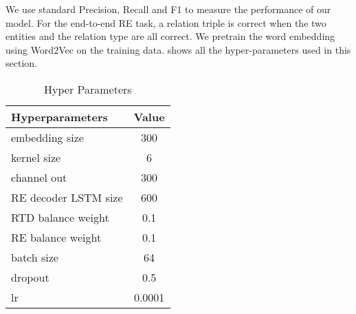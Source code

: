We use standard Precision, Recall and F1 to measure the 
performance of our model. 
For the end-to-end RE task, a relation
triple is correct when the two entities and the relation type are all correct.
%
We pretrain the word embedding using Word2Vec on the training data.
 shows all the hyper-parameters used in this section. 

\begin{table}[th!]
\small
  \begin{center}
  \caption{Hyper Parameters} \label{tab:hyper}
    \begin{tabular}{l|c}
      \hline \bf Hyperparameters & \bf Value \\ \hline
      embedding size & 300 \\
      kernel size & 6 \\
      channel out & 300 \\
      RE decoder LSTM size & 600 \\
      RTD balance weight & 0.1 \\
      RE balance weight & 0.1 \\  
      batch size & 64 \\
      dropout & 0.5 \\
      lr & 0.0001 \\
      \hline
    \end{tabular}
  \end{center}
\end{table}


